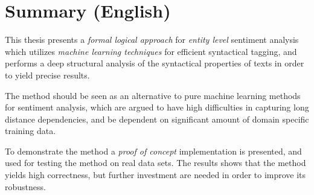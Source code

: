 
\chapter{Summary (English)}

This thesis presents a \emph{formal logical approach} for \emph{entity level} sentiment analysis which utilizes \emph{machine learning techniques} for efficient syntactical tagging, and performs a deep structural analysis of the syntactical properties of texts in order to yield precise results.

The method should be seen as an alternative to pure machine learning methods for sentiment analysis, which are argued to have high difficulties in capturing long distance dependencies, and be dependent on significant amount of domain specific training data.

To demonstrate the method a \emph{proof of concept} implementation is presented, and used for testing the method on real data sets. The results shows that the method yields high correctness, but further investment are needed in order to improve its robustness. 